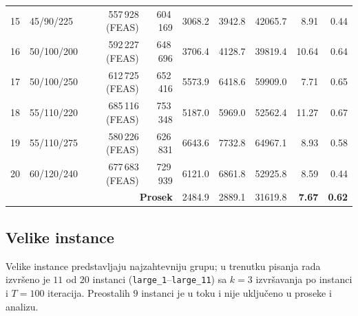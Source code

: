 \documentclass[12pt,a4paper]{article}
\begin{document}
\begin{longtable}{r l r r r r r r r}
15 & 45/90/225 & 557\,928 (FEAS) & 604\,169 & 3068.2 & 3942.8 & 42065.7 & 8.91 & 0.44 \\
16 & 50/100/200 & 592\,227 (FEAS) & 648\,696 & 3706.4 & 4128.7 & 39819.4 & 10.64 & 0.64 \\
17 & 50/100/250 & 612\,725 (FEAS) & 652\,416 & 5573.9 & 6418.6 & 59909.0 & 7.71 & 0.65 \\
18 & 55/110/220 & 685\,116 (FEAS) & 753\,348 & 5187.0 & 5969.0 & 52562.4 & 11.27 & 0.67 \\
19 & 55/110/275 & 580\,226 (FEAS) & 626\,831 & 6643.6 & 7732.8 & 64967.1 & 8.93 & 0.58 \\
20 & 60/120/240 & 677\,683 (FEAS) & 729\,939 & 6121.0 & 6861.8 & 52925.8 & 8.59 & 0.44 \\
\midrule
\multicolumn{4}{r}{\textbf{Prosek}} & 2484.9 & 2889.1 & 31619.8 & \textbf{7.67} & \textbf{0.62} \\
\end{longtable}

\clearpage

\subsection{Velike instance}

Velike instance predstavljaju najzahtevniju grupu; u trenutku pisanja rada
izvršeno je $11$ od $20$ instanci (\texttt{large\_1}--\texttt{large\_11}) sa
$k=3$ izvršavanja po instanci i $T=100$ iteracija. Preostalih $9$ instanci je u
toku i nije uključeno u proseke i analizu.
\end{document}
